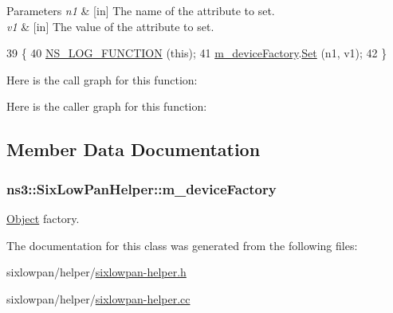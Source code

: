 \begin{DoxyParams}{Parameters}
{\em n1} & \mbox{[}in\mbox{]} The name of the attribute to set. \\
\hline
{\em v1} & \mbox{[}in\mbox{]} The value of the attribute to set. \\
\hline
\end{DoxyParams}

\begin{DoxyCode}
39 \{
40   \hyperlink{log-macros-disabled_8h_a90b90d5bad1f39cb1b64923ea94c0761}{NS\_LOG\_FUNCTION} (\textcolor{keyword}{this});
41   \hyperlink{classns3_1_1SixLowPanHelper_a0b562ce864637399adf09d351c30a42d}{m\_deviceFactory}.\hyperlink{classns3_1_1ObjectFactory_aef5c0d5019c96bdf01cefd1ff83f4a68}{Set} (n1, v1);
42 \}
\end{DoxyCode}


Here is the call graph for this function\+:




Here is the caller graph for this function\+:




\subsection{Member Data Documentation}
\subsubsection[{\texorpdfstring{m\+\_\+device\+Factory}{m_deviceFactory}}]{ ns3\+::\+Six\+Low\+Pan\+Helper\+::m\+\_\+device\+Factory\hspace{0.3cm}{\ttfamily [private]}}\hypertarget{classns3_1_1SixLowPanHelper_a0b562ce864637399adf09d351c30a42d}{}\label{classns3_1_1SixLowPanHelper_a0b562ce864637399adf09d351c30a42d}


\hyperlink{classns3_1_1Object}{Object} factory. 



The documentation for this class was generated from the following files\+:\begin{DoxyCompactItemize}
\item 
sixlowpan/helper/\hyperlink{sixlowpan-helper_8h}{sixlowpan-\/helper.\+h}\item 
sixlowpan/helper/\hyperlink{sixlowpan-helper_8cc}{sixlowpan-\/helper.\+cc}\end{DoxyCompactItemize}

